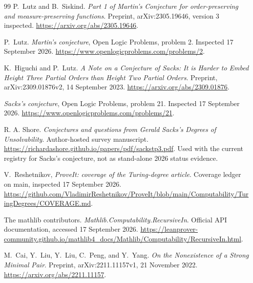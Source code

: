 \documentclass[11pt,a4paper]{article}
\theoremstyle{definition}\newtheorem{definition}[theorem]{Definition}
\theoremstyle{remark}\newtheorem{remark}[theorem]{Remark}
\begin{document}
\begin{thebibliography}{99}
P.~Lutz and B.~Siskind.
\emph{Part 1 of Martin's Conjecture for order-preserving and measure-preserving functions}.
Preprint, arXiv:2305.19646, version 3 inspected.
\url{https://arxiv.org/abs/2305.19646}.

P.~Lutz.
\emph{Martin's conjecture}, Open Logic Problems, problem 2.
Inspected 17 September 2026.
\url{https://www.openlogicproblems.com/problems/2}.

K.~Higuchi and P.~Lutz.
\emph{A Note on a Conjecture of Sacks: It is Harder to Embed Height Three Partial Orders than Height Two Partial Orders}.
Preprint, arXiv:2309.01876v2, 14 September 2023.
\url{https://arxiv.org/abs/2309.01876}.

\emph{Sacks's conjecture}, Open Logic Problems, problem 21.
Inspected 17 September 2026.
\url{https://www.openlogicproblems.com/problems/21}.

R. A. Shore. \emph{Conjectures and questions from Gerald Sacks's
Degrees of Unsolvability}. Author-hosted survey manuscript.
\url{https://richardashore.github.io/papers/pdf/sackstp3.pdf}.
Used with the current registry for Sacks's conjecture, not as stand-alone
2026 status evidence.

V.~Reshetnikov, \emph{ProveIt: coverage of the Turing-degree article}.
Coverage ledger on main, inspected 17 September 2026.
\url{https://github.com/VladimirReshetnikov/ProveIt/blob/main/Computability/TuringDegrees/COVERAGE.md}.

The mathlib contributors.
\emph{Mathlib.Computability.RecursiveIn}. Official API documentation,
accessed 17 September 2026.
\url{https://leanprover-community.github.io/mathlib4_docs/Mathlib/Computability/RecursiveIn.html}.

M.~Cai, Y.~Liu, Y.~Liu, C.~Peng, and Y.~Yang.
\emph{On the Nonexistence of a Strong Minimal Pair}.
Preprint, arXiv:2211.11157v1, 21 November 2022.
\url{https://arxiv.org/abs/2211.11157}.

\end{thebibliography}
\end{document}
